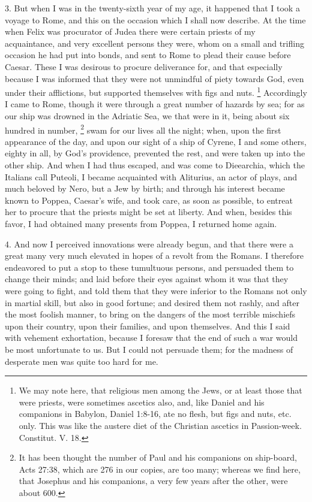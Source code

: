 3. But when I was in the twenty-sixth year of my age, it happened that I
took a voyage to Rome, and this on the occasion which I shall now
describe. At the time when Felix was procurator of Judea there were
certain priests of my acquaintance, and very excellent persons they were,
whom on a small and trifling occasion he had put into bonds, and sent to
Rome to plead their cause before Caesar. These I was desirous to procure
deliverance for, and that especially because I was informed that they were
not unmindful of piety towards God, even under their afflictions, but
supported themselves with figs and nuts. \footnote{We may note here, that
religious men among the Jews, or at least those that were priests, were
sometimes ascetics also, and, like Daniel and his companions in Babylon,
Daniel 1:8-16, ate no flesh, but figs and nuts, etc. only. This was like
the austere diet of the Christian ascetics in Passion-week. Constitut. V.
18.} Accordingly I
came to Rome, though it were through a great number of hazards by sea; for
as our ship was drowned in the Adriatic Sea, we that were in it, being
about six hundred in number, \footnote{It has been thought the
number of Paul and his companions on ship-board, Acts 27:38, which are 276
in our copies, are too many; whereas we find here, that Josephus and his
companions, a very few years after the other, were about 600.} swam for our lives all the night;
when, upon the first appearance of the day, and upon our sight of a ship
of Cyrene, I and some others, eighty in all, by God's providence,
prevented the rest, and were taken up into the other ship. And when I had
thus escaped, and was come to Dieearchia, which the Italians call Puteoli,
I became acquainted with Aliturius, an actor of plays, and much beloved by
Nero, but a Jew by birth; and through his interest became known to Poppea,
Caesar's wife, and took care, as soon as possible, to entreat her to
procure that the priests might be set at liberty. And when, besides this
favor, I had obtained many presents from Poppea, I returned home again.

4. And now I perceived innovations were already begun, and that there were
a great many very much elevated in hopes of a revolt from the Romans. I
therefore endeavored to put a stop to these tumultuous persons, and
persuaded them to change their minds; and laid before their eyes against
whom it was that they were going to fight, and told them that they were
inferior to the Romans not only in martial skill, but also in good
fortune; and desired them not rashly, and after the most foolish manner,
to bring on the dangers of the most terrible mischiefs upon their country,
upon their families, and upon themselves. And this I said with vehement
exhortation, because I foresaw that the end of such a war would be most
unfortunate to us. But I could not persuade them; for the madness of
desperate men was quite too hard for me.

